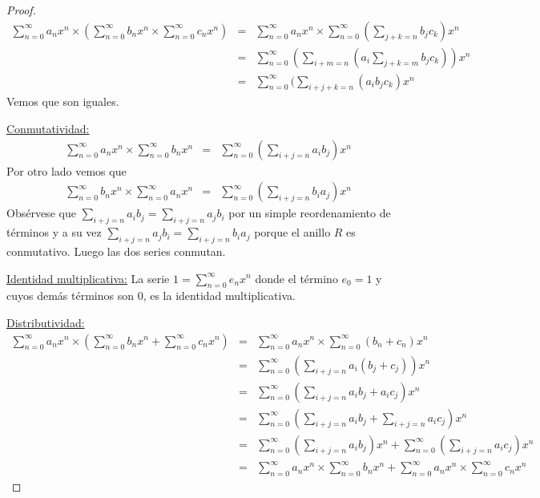 \documentclass[letter,twoside,12pt]{article}
\begin{document}
\begin{enumerate}[label=\textbf{(\alph*)}]
\begin{proof}
\begin{eqnarray}
\sum_{n=0}^{\infty}a_nx^n \times (\sum_{n=0}^{\infty}b_nx^n \times  \sum_{n=0}^{\infty}c_nx^n)&=& \sum_{n=0}^{\infty}a_nx^n \times \sum_{n=0}^{\infty}(\sum_{j+k=n}b_jc_{k})x^n \nonumber
\\&=&\sum_{n=0}^{\infty}(\sum_{i+m=n}(a_i\sum_{j+k=m}b_jc_{k}))x^n \nonumber
\\&=&\sum_{n=0}^{\infty}(\sum_{i+j+k=n}(a_ib_jc_{k})x^n
\nonumber
\end{eqnarray}
Vemos que son iguales.
\item[\underline{Conmutatividad:}]
\begin{eqnarray}
\sum_{n=0}^{\infty}a_nx^n \times \sum_{n=0}^{\infty}b_nx^n &=& \sum_{n=0}^{\infty}(\sum_{i+j=n}a_ib_{j})x^n \nonumber
\end{eqnarray}
Por otro lado vemos que
\begin{eqnarray}
\sum_{n=0}^{\infty}b_nx^n \times \sum_{n=0}^{\infty}a_nx^n &=& \sum_{n=0}^{\infty}(\sum_{i+j=n}b_ia_{j})x^n \nonumber
\end{eqnarray}
Obs\'ervese que $\sum_{i+j=n}a_ib_j=\sum_{i+j=n}a_jb_i$ por un simple reordenamiento de t\'erminos y a su vez $\sum_{i+j=n}a_jb_i=\sum_{i+j=n}b_ia_j$ porque el anillo $R$ es conmutativo. Luego las dos series conmutan.
\item[\underline{Identidad multiplicativa:}]
La serie $1=\sum_{n=0}^{\infty}e_nx^n$ donde el t\'ermino $e_0=1$ y cuyos dem\'as t\'erminos son 0, es la identidad multiplicativa.
\item[\underline{Distributividad:}]
\begin{eqnarray}
\sum_{n=0}^{\infty}a_nx^n \times (\sum_{n=0}^{\infty}b_nx^n+\sum_{n=0}^{\infty}c_nx^n) &=& \sum_{n=0}^{\infty}a_nx^n \times \sum_{n=0}^{\infty}(b_n+c_{n})x^n \nonumber
\\&=& \sum_{n=0}^{\infty}(\sum_{i+j=n}a_i(b_j+c_{j}))x^n \nonumber
\\&=& \sum_{n=0}^{\infty}(\sum_{i+j=n}a_ib_j+a_ic_{j})x^n \nonumber
\\&=& \sum_{n=0}^{\infty}(\sum_{i+j=n}a_ib_j+\sum_{i+j=n}a_ic_{j})x^n \nonumber
\\&=& \sum_{n=0}^{\infty}(\sum_{i+j=n}a_ib_j)x^n+\sum_{n=0}^{\infty}(\sum_{i+j=n}a_ic_{j})x^n \nonumber
\\&=& \sum_{n=0}^{\infty}a_nx^n\times \sum_{n=0}^\infty b_nx^n+\sum_{n=0}^{\infty}a_nx^n\times \sum_{n=0}^\infty c_nx^n \nonumber
\end{eqnarray}


\end{proof}
\end{enumerate}
\end{document}
